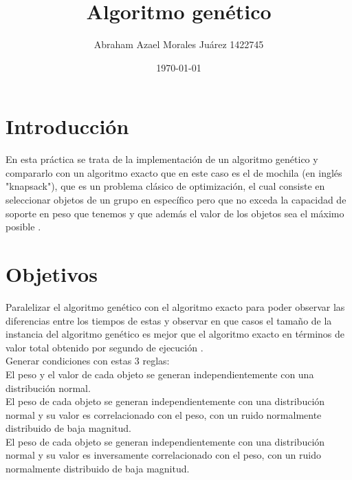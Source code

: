 \documentclass{article}
\author{Abraham Azael Morales Juárez  1422745}
\title{Algoritmo genético}
\date{\today}
\begin{document}
\maketitle

\section{Introducción}
En esta práctica se trata de la implementación de un algoritmo genético y compararlo con un algoritmo exacto que en este caso es el de mochila (en inglés "knapsack"), que es un problema clásico de optimización, el cual consiste en seleccionar objetos de un grupo en específico pero que no exceda la capacidad de soporte en peso que tenemos y que además el valor de los objetos sea el máximo posible \cite{REF1}.
\section{Objetivos}
Paralelizar el algoritmo genético con el algoritmo exacto para poder observar las diferencias entre los tiempos de estas y observar en que casos  el tamaño de la instancia del algoritmo genético es mejor que el algoritmo exacto en términos de valor total obtenido por segundo de ejecución \cite{REF1}.\\
Generar condiciones con estas 3 reglas:\\ 
El peso y el valor de cada objeto se generan independientemente con una distribución normal.\\
El peso de cada objeto se generan independientemente con una distribución normal y su valor es correlacionado con el peso, con un ruido normalmente distribuido de baja magnitud.\\
El peso de cada objeto se generan independientemente con una distribución normal y su valor es inversamente correlacionado con el peso, con un ruido normalmente distribuido de baja magnitud.
\end{document}
